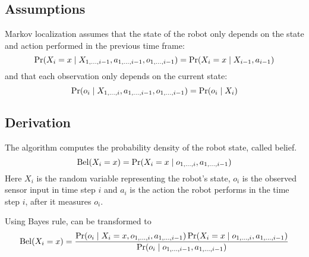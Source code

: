 \subsection{Assumptions}
\label{sec:markov-assumptions}
Markov localization assumes that the state of the robot only depends
on the state and action performed in the previous time frame:
	\begin{equation}
		\operatorname{\mathrm{Pr}}(X_i = x \mid X_{1, \dotsc, i - 1}, a_{1, \dotsc, i - 1},
		o_{1, \dotsc, i - 1}) =
		\operatorname{\mathrm{Pr}}(X_i = x \mid X_{i - 1}, a_{i - 1})
	\end{equation}
and that each observation only depends on the current state:
	\begin{equation}
		\label{eq:markov-observation-independence}
		\operatorname{\mathrm{Pr}}(o_i \mid X_{1, \dotsc, i}, a_{1, \dotsc, i - 1},
		o_{1, \dotsc, i - 1}) =
		\operatorname{\mathrm{Pr}}(o_i \mid X_i)
	\end{equation}


\subsection{Derivation}

The algorithm computes the probability density of the robot state, called belief.
\begin{equation}
	\label{eq:markov-belief-def}
	\operatorname{\mathrm{Bel}}(X_i = x) = \operatorname{\mathrm{Pr}}(X_i = x \mid o_{1, \dotsc, i}, a_{1,\dotsc,i - 1})
\end{equation}
Here \(X_i\) is the random variable representing the robot's state,
\(o_i\) is the observed sensor input in time step \(i\) and \(a_i\)
is the action the robot performs in the time step \(i\), after it
measures \(o_i\).

Using Bayes rule,  can be transformed to
\begin{equation}
	\label{eq:markov-derivation1}
	\operatorname{\mathrm{Bel}}(X_i = x) =
	\frac{
		\operatorname{\mathrm{Pr}}(o_i \mid X_i = x, o_{1, \dotsc, i}, a_{1,\dotsc,i - 1})
		\operatorname{\mathrm{Pr}}(X_i = x \mid o_{1, \dotsc, i}, a_{1, \dotsc, i - 1})
	}{
		\operatorname{\mathrm{Pr}}(o_i \mid o_{1, \dotsc, i-1}, a_{1, \dotsc, i-1})
	}
\end{equation}

